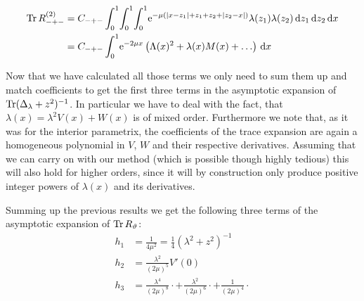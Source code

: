 \begin{align*}
  \Tr R_{-+-}^{(2)} &= C_{-+-} \Int{x}{
    \Int{z_2}{
      \Int{z_1}{
        \Eto{-\mu(\Abs{x-z_1}+z_1+z_2+\Abs{z_2-x})}\lambda(z_1)\lambda(z_2)
      }
    }
  } \\
  &= C_{-+-} \Int{x}{
    \Eto{-2\mu x}
    \left(
      \Lambda(x)^2 + \lambda(x)M(x) + \ldots
    \right)
  }
\end{align*}

Now that we have calculated all those terms we only need to sum them up and
match coefficients to get the first three terms in the asymptotic expansion of
$\Tr(\Delta_\lambda + z^2)^{-1}$. In particular we have to deal with the fact,
that $\lambda(x) = \lambda^2 V(x) + W(x)$ is of mixed order. Furthermore we note
that, as it was for the interior parametrix, the coefficients of the trace
expansion are again a homogeneous polynomial in $V$, $W$ and their respective
derivatives. Assuming that we can carry on with our method (which is possible
though highly tedious) this will also hold for higher orders, since it will by
construction only produce positive integer powers of $\lambda(x)$ and its
derivatives.

Summing up the previous results we get the following three terms of the
asymptotic expansion of $\Tr R_\theta$:
\begin{align}
  h_1 &= \frac{1}{4\mu^2} = \frac{1}{4} (\lambda^2 + z^2)^{-1} \\
  h_2 &= \frac{\lambda^2}{(2\mu)^5} V'(0) \\
  h_3 &= \frac{\lambda^4}{(2\mu)^8}\cdot + \frac{\lambda^2}{(2\mu)^6}\cdot + \frac{1}{(2\mu)^4}\cdot
\end{align}


